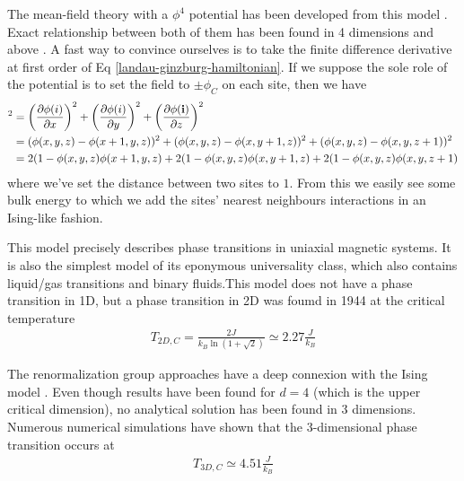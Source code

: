 The mean-field theory with a $\phi^4$ potential has been developed from this model \cite{bellac_equilibrium_2004}. Exact relationship between both of them has been found in 4 dimensions and above \cite{aizenman_proof_1981}. A fast way to convince ourselves is to take the finite difference derivative at first order of Eq \eqref{landau-ginzburg-hamiltonian}. If we suppose the sole role of the potential is to set the field to $\pm \phi_C$ on each site, then we have
\begin{align}
    [{\boldsymbol \nabla} \phi(i)]^2 &= \left( \frac{\partial \phi(i)}{\partial x} \right)^2  + \left( \frac{\partial \phi(i)}{\partial y} \right)^2 + \left( \frac{\partial \phi({\bf i})}{\partial z} \right)^2\nn
    &= (\phi(x,y,z)-\phi(x+1,y,z))^2 + (\phi(x,y,z)-\phi(x,y+1,z))^2 + (\phi(x,y,z)-\phi(x,y,z+1))^2 \nn
    &= 2 (1-\phi(x,y,z)\phi(x+1,y,z) + 2 (1-\phi(x,y,z)\phi(x,y+1,z) +2 (1-\phi(x,y,z)\phi(x,y,z+1) 
    \label{discretisation-landau}
\end{align}
where we've set the distance between two sites to $1$.
From this we easily see some bulk energy to which we add the sites' nearest neighbours interactions in an Ising-like fashion.

This model precisely describes  phase transitions in uniaxial magnetic systems\cite{de_jongh_experiments_1974,wp_wold_ising_2000,ikeda_neutron_1973}. It is also the simplest model of its eponymous universality class, which also contains liquid/gas transitions and binary fluids.This model does not have a phase transition in 1D, but a phase transition in 2D was foumd in 1944\cite{onsager_crystal_1944} at the critical temperature 
\begin{align}
     T_{2D,C} = \frac{2J}{k_B \ln(1 + \sqrt{2})} \simeq 2.27 \frac{J}{k_B}
\end{align}

The renormalization group approaches have a deep connexion with the Ising model \cite{frohlich_triviality_1981,goldenfeld_lectures_2018}. Even though results have been found for $d=4$ (which is the upper critical dimension), no analytical solution has been found in 3 dimensions. Numerous numerical simulations  \cite{talapov_magnetization_1996,preis_gpu_2009} have shown that the 3-dimensional phase transition occurs at 
\begin{align}
    T_{3D,C} \simeq 4.51 \frac{J}{k_B}
\end{align}


